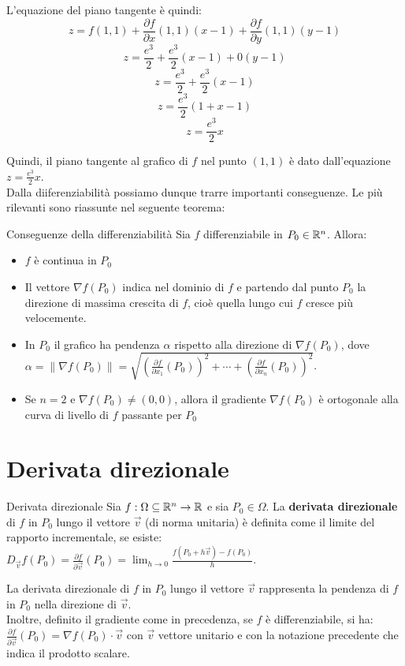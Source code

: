 L'equazione del piano tangente è quindi:
\[
z = f(1,1) + \frac{\partial f}{\partial x}(1,1)(x-1) + \frac{\partial f}{\partial y}(1,1)(y-1)
\]
\[
z = \frac{e^{3}}{2} + \frac{e^{3}}{2}(x-1) + 0(y-1)
\]
\[
z = \frac{e^{3}}{2} + \frac{e^{3}}{2}(x-1)
\]
\[
z = \frac{e^{3}}{2}(1 + x - 1)
\]
\[
z = \frac{e^{3}}{2}x
\]

Quindi, il piano tangente al grafico di $f$ nel punto $(1,1)$ è dato dall'equazione $z = \frac{e^{3}}{2}x$.\\

Dalla diiferenziabilità possiamo dunque trarre importanti conseguenze. Le più rilevanti sono riassunte nel seguente teorema:

\begin{teorema}{Conseguenze della differenziabilità}
  Sia $f$ differenziabile in $P_0 \in \mathbb{R}^n$. Allora:
  \begin{itemize}
    \item $f$ è continua in $P_0$
    \item Il vettore $\nabla f(P_0)$ indica nel dominio di $f$ e partendo dal punto $P_0$ la direzione di massima crescita di $f$, cioè quella lungo cui $f$ cresce più velocemente.
    \item In $P_0$ il grafico ha pendenza $\alpha$ rispetto alla direzione di $\nabla f(P_0)$, dove $\alpha =  \|\nabla f(P_0)\| = \sqrt{\left(\frac{\partial f}{\partial x_1}(P_0)\right)^2 + \cdots + \left(\frac{\partial f}{\partial x_n}(P_0)\right)^2}$.
    \item Se $n=2$ e $\nabla f(P_0)\neq (0,0)$, allora il gradiente $\nabla f(P_0)$ è ortogonale alla curva di livello di $f$ passante per $P_0$
\end{itemize}
\end{teorema}

\section{Derivata direzionale}
\begin{definizione}{Derivata direzionale}
Sia $f:\Omega \subseteq \mathbb{R}^n \rightarrow \mathbb{R}$ e sia $P_0 \in \Omega$. La \textbf{derivata direzionale} di $f$ in $P_0$ lungo il vettore $\vec v$ (di norma unitaria) è definita come il limite del rapporto incrementale, se esiste: $D_{\vec v}f(P_0) = \frac{\partial f}{\partial \vec v}(P_0) = \lim_{h \to 0} \frac{f(P_0 + h\vec v) - f(P_0)}{h}$.
\end{definizione}

\begin{osservazione}{}
La derivata direzionale di $f$ in $P_0$ lungo il vettore $\vec v$ rappresenta la pendenza di $f$ in $P_0$ nella direzione di $\vec v$. \\
Inoltre, definito il gradiente come in precedenza, se $f$ è differenziabile, si ha: $\frac{\partial f}{\partial \vec v}(P_0) = \nabla f(P_0) \cdot \vec v $ con $\vec v$ vettore unitario e con la notazione precedente che indica il prodotto scalare.
\end{osservazione}

